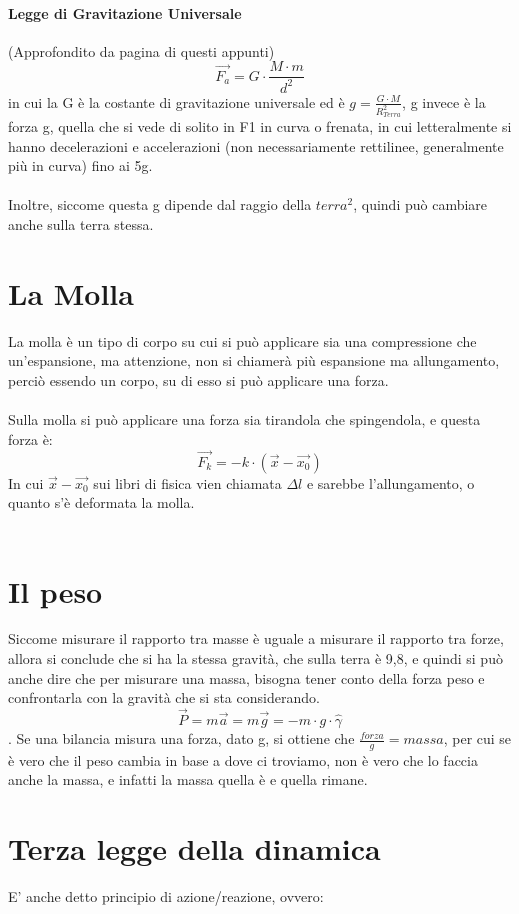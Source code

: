 \documentclass[12pt, a4paper, openany, oneside]{book}
\begin{document}
\paragraph{Legge di Gravitazione Universale}
(Approfondito da pagina \pageref{LeggeGrav} di questi appunti)
\[\overrightarrow{F_{a}} = G \cdot \frac{M\cdot m}{d^{2}}\] in cui la G è la
costante di gravitazione universale ed è $g = \frac{G\cdot M}{R_{Terra}^{2}}$, 
g invece è la forza g, quella che si vede di solito in F1 in curva o frenata, in
cui letteralmente si hanno decelerazioni e accelerazioni (non necessariamente 
rettilinee, generalmente più in curva) fino ai 5g. \\ \\
Inoltre, siccome questa g dipende dal raggio della $terra^{2}$, quindi può 
cambiare anche sulla terra stessa.
\section{La Molla}
La molla è un tipo di corpo su cui si può applicare sia una compressione che 
un'espansione, ma attenzione, non si chiamerà più espansione ma allungamento, 
perciò essendo un corpo, su di esso si può applicare una forza. \\ \\
Sulla molla si può applicare una forza sia tirandola che spingendola, e questa
forza è:
\[
\overrightarrow{F_{k}} = -k \cdot (\overrightarrow{x} - \overrightarrow{x_{0}})
\]
In cui $\overrightarrow{x} - \overrightarrow{x_{0}}$ sui libri di fisica vien
chiamata $\Delta l$ e sarebbe l'allungamento, o quanto s'è deformata la molla.
\\ \\
\section{Il peso}
Siccome misurare il rapporto tra masse è uguale a misurare il rapporto tra forze,
allora si conclude che si ha la stessa gravità, che sulla terra è 9,8, e quindi
si può anche dire che per misurare una massa, bisogna tener conto della forza peso 
e confrontarla con la gravità che si sta considerando.
\[\overrightarrow{P} = m \overrightarrow{a} = m \overrightarrow{g} = - m\cdot 
g \cdot \widehat \gamma\]. 
Se una bilancia misura una forza, dato g, si ottiene che $\frac{forza}{g} = massa$,
per cui se è vero che il peso cambia in base a dove ci troviamo, non è vero
che lo faccia anche la massa, e infatti la massa quella è e quella rimane.
\section{Terza legge della dinamica}
E' anche detto principio di azione/reazione, ovvero:
\end{document}
